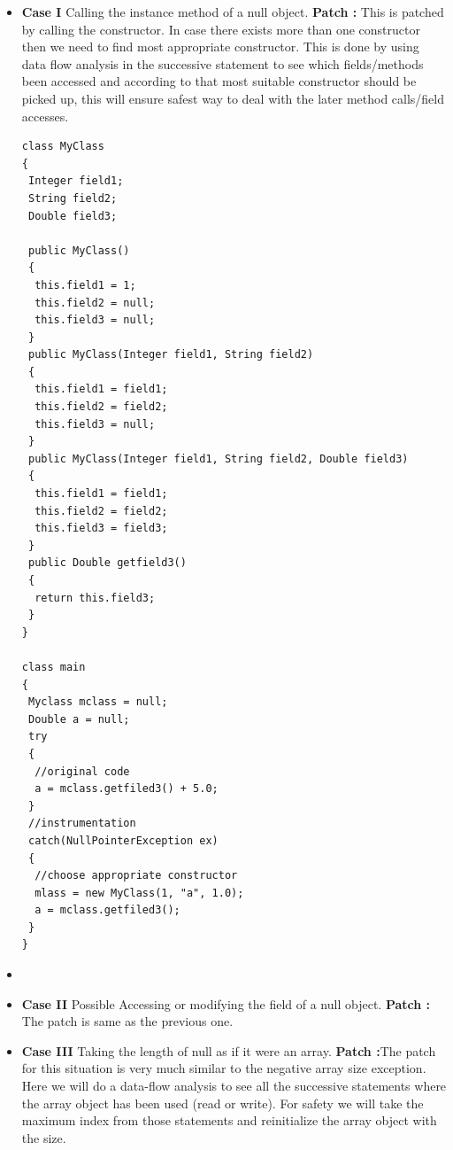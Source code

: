 \documentclass{sigplanconf}
\begin{document}
\begin{itemize}
  \item \textbf{Case I} Calling the instance method of a null object. \newline
  \textbf{Patch :} This is patched by calling the constructor. In case there
  exists more than one constructor then we need to find most appropriate
  constructor. This is done by using data flow analysis in the successive
  statement to see which fields/methods been accessed and according to that
  most suitable constructor should be picked up, this will ensure safest way to
  deal with the later method calls/field accesses.
  
  \lstset{language=Java, caption=appropriate constructor, label=patchingexample2}

\begin{lstlisting}
class MyClass
{
 Integer field1;
 String field2;
 Double field3;

 public MyClass()
 {
  this.field1 = 1;
  this.field2 = null;
  this.field3 = null;
 } 
 public MyClass(Integer field1, String field2)
 {
  this.field1 = field1;
  this.field2 = field2;
  this.field3 = null;
 } 
 public MyClass(Integer field1, String field2, Double field3)
 {
  this.field1 = field1;
  this.field2 = field2;
  this.field3 = field3;
 }
 public Double getfield3()
 {
  return this.field3;
 }
}

class main
{
 Myclass mclass = null;
 Double a = null;
 try
 {
  //original code
  a = mclass.getfiled3() + 5.0;
 }
 //instrumentation
 catch(NullPointerException ex)
 {
  //choose appropriate constructor
  mlass = new MyClass(1, "a", 1.0); 
  a = mclass.getfiled3();
 }
}
\end{lstlisting}
  \item 
  
  \item \textbf{Case II} Possible Accessing or modifying the field of a null
  object.\newline
  \textbf{Patch :} The patch is same as the previous one.
  
  \item \textbf{Case III} Taking the length of null as if it were an
  array.\newline
  \textbf{Patch :}The patch for this situation is very much similar to the
  negative array size exception. Here we will do a data-flow analysis to see all
  the successive statements where the array object has been used (read or
  write). For safety we will take the maximum index from those statements and
  reinitialize the array object with the size.
    

\end{itemize}
\end{document}
